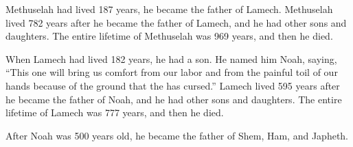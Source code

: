 {Methuselah
had lived 187
years,
he became the father
of Lamech.
Methuselah
lived 782
years
after
he became the father
of Lamech,
and he had other
sons
and daughters.
The entire
lifetime
of Methuselah
was 969
years,
and then he died.
\par }{\PP {}When
Lamech
had lived
182
years,
he had a son.
He named
him Noah,
saying,
“This
one will bring us comfort
from our labor
and from
the painful toil
of our hands
because of the ground
that
the {}
has
cursed.”
Lamech
lived
595
years
after
he became the father
of Noah,
and he had other
sons
and daughters.
The entire
lifetime
of Lamech
was 777
years,
and then he died.
\par }{\PP {}After
Noah
was 500
years
old,
he
became the father
of Shem,
Ham,
and Japheth.

}
